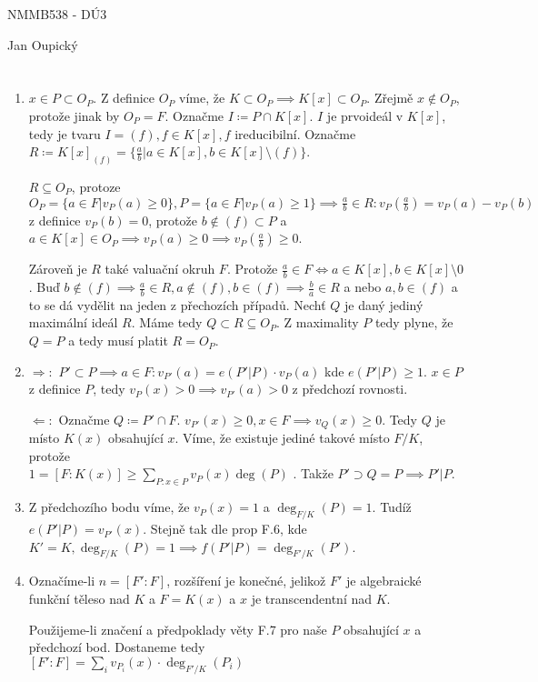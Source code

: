 \documentclass[12pt, a4paper]{article}
\begin{document}
\begin{center}
\large NMMB538 - DÚ3

\normalsize Jan Oupický
\end{center}
\vspace{1\baselineskip}

\section{}
\begin{enumerate}[label=(\alph*)]
    \item $x \in P \subset O_P$. Z definice $O_P$ víme, že $K \subset O_P \implies K[x] \subset O_P$. Zřejmě $x\notin O_P$, protože jinak by $O_P = F$. Označme $I \coloneqq P \cap K[x]$. $I$ je prvoideál v $K[x]$, tedy je tvaru $I = (f), f \in K[x], f$ ireducibilní. Označme $R \coloneqq K[x]_{(f)} = \{ \frac{a}{b} | a \in K[x], b \in K[x] \setminus (f) \}$. 

    $R \subseteq O_P$, protoze $O_P = \{a \in F | v_P(a) \geq 0 \}, P = \{ a \in F | v_P(a) \geq 1 \} \implies \frac{a}{b} \in R: v_P(\frac{a}{b}) = v_P(a)-v_P(b)$ z definice $v_P(b)=0$, protože $b \notin (f) \subset P$ a $a \in K[x] \in O_P \implies v_P(a) \geq 0 \implies v_P(\frac{a}{b}) \geq 0$. 

    Zároveň je $R$ také valuační okruh $F$. Protože $\frac{a}{b} \in F \iff a \in K[x], b \in K[x]\setminus 0$. Buď $b \notin (f) \implies \frac{a}{b} \in R, a \notin (f), b \in (f) \implies \frac{b}{a} \in R$ a nebo $a,b \in (f)$ a to se dá vydělit na jeden z přechozích případů. Nechť $Q$ je daný jediný maximální ideál $R$. Máme tedy $Q \subset R \subseteq O_P$. Z maximality $P$ tedy plyne, že $Q = P$ a tedy musí platit $R = O_P$.

    \item $\Rightarrow:$ $P' \subset P \implies a\in F : v_{P'}(a) = e(P'|P)\cdot v_P(a)$ kde $e(P'|P)\geq 1$. $x \in P$ z definice $P$, tedy $v_P(x) > 0 \implies v_{P'}(a) > 0$ z předchozí rovnosti.

    $\Leftarrow:$ Označme $Q \coloneqq P' \cap F$. $v_{P'}(x)\geq 0, x \in F \implies v_Q(x) \geq 0$. Tedy $Q$ je místo $K(x)$ obsahující $x$. Víme, že existuje jediné takové místo $F/K$, protože \\$1=[F:K(x)]\geq \sum_{P:x\in P} v_P(x)\deg(P)$ . Takže $P' \supset Q = P \implies P' | P$.

    \item Z předchozího bodu víme, že $v_P(x)=1$ a $\deg_{F/K}(P)=1$. Tudíž $e(P'|P)=v_{P'}(x)$. Stejně tak dle prop F.6, kde $K'=K, \deg_{F/K}(P)=1 \implies f(P'|P)=\deg_{F'/K}(P')$.
    \item Označíme-li $n = [F':F]$, rozšíření je konečné, jelikož $F'$ je algebraické funkční těleso nad $K$ a $F=K(x)$ a $x$ je transcendentní nad $K$.

    Použijeme-li značení a předpoklady věty F.7 pro naše $P$ obsahující $x$ a předchozí bod. Dostaneme tedy \\$[F':F]=\sum_i v_{P_i}(x)\cdot \deg_{F'/K}(P_i)$
\end{enumerate}
\end{document}
